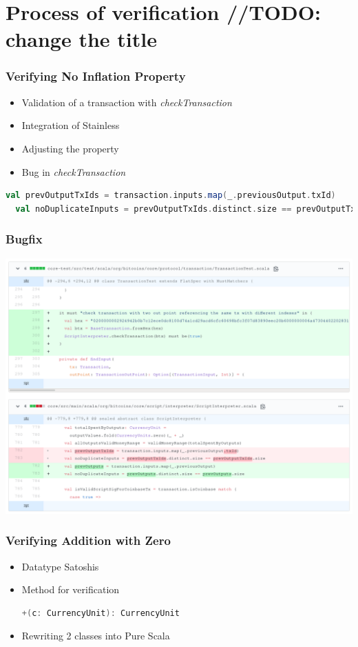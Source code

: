 \documentclass{beamer}
\begin{document}
\section{Process of verification //TODO: change the title}


\begin{frame}[fragile]
\frametitle{Verifying No Inflation Property}
\begin{itemize}
  \item Validation of a transaction with \textit{checkTransaction}
  \item Integration of Stainless
  \item Adjusting the property
  \item Bug in \textit{checkTransaction}
\end{itemize}
\pause
\begin{lstlisting}[language=Scala]
  val prevOutputTxIds = transaction.inputs.map(_.previousOutput.txId)
  val noDuplicateInputs = prevOutputTxIds.distinct.size == prevOutputTxIds.size
\end{lstlisting}
\end{frame}


\begin{frame}
\frametitle{Bugfix}
\centering
\includegraphics[width=\textwidth,height=0.8\textheight,keepaspectratio]{assets/bitcoin-s-pr.png}
\end{frame}


\begin{frame}[fragile]
\frametitle{Verifying Addition with Zero}
\begin{itemize}%
  \item Datatype Satoshis
  \item Method for verification
  \begin{lstlisting}[language=Scala, numbers=none]
    +(c: CurrencyUnit): CurrencyUnit
  \end{lstlisting}
  \item Rewriting 2 classes into Pure Scala
\end{itemize}
\end{frame}
\end{document}
